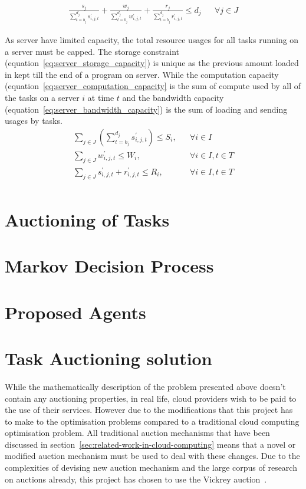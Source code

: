 \begin{align}
    \frac{s_j}{\sum^{d_j}_{t=b_j} s^{'}_{i,j,t}} + \frac{w_j}{\sum^{d_j}_{t=b_j} w^{'}_{i,j,t}}  +
    \frac{r_j}{\sum^{d_j}_{t=b_j} r^{'}_{i,j,t}} \leq d_j && \forall{j \in J}  \label{eq:deadline}
\end{align}

As server have limited capacity, the total resource usages for all tasks running on a server must be capped.
The storage constraint (equation~\eqref{eq:server_storage_capacity}) is unique as the previous amount
loaded in kept till the end of a program on server. While the computation capacity
(equation~\eqref{eq:server_computation_capacity} is the sum of compute used by all of the tasks on a server $i$ at time $t$ and the
bandwidth capacity (equation~\eqref{eq:server_bandwidth_capacity}) is the sum of loading and sending usages by tasks.
\begin{align}
    \sum_{j \in J} \left(\sum^{d_j}_{t=b_j} s^{'}_{i,j,t} \right) \leq S_i, && \forall{i \in I} \label{eq:server_storage_capacity} \\
    \sum_{j \in J} w^{'}_{i,j,t} \leq W_i, && \forall{i \in I, t \in T} \label{eq:server_computation_capacity} \\
    \sum_{j \in J} s^{'}_{i,j,t} + r^{'}_{i,j,t} \leq R_i, && \forall{i \in I, t \in T} \label{eq:server_bandwidth_capacity} \\
\end{align}


\section{Auctioning of Tasks}

\section{Markov Decision Process}

\section{Proposed Agents}

\section{Task Auctioning solution}\label{sec:task-auctioning}
While the mathematically description of the problem presented above doesn't contain any auctioning properties, in real
life, cloud providers wish to be paid to the use of their services. However due to the modifications that
this project has to make to the optimisation problems compared to a traditional cloud computing optimisation problem.
All traditional auction mechanisms that have been discussed in section~\ref{sec:related-work-in-cloud-computing} means
that a novel or modified auction mechanism must be used to deal with these changes. Due to the complexities of devising
new auction mechanism and the large corpus of research on auctions already, this project has chosen to use the Vickrey
auction~\citep{vickrey}.

